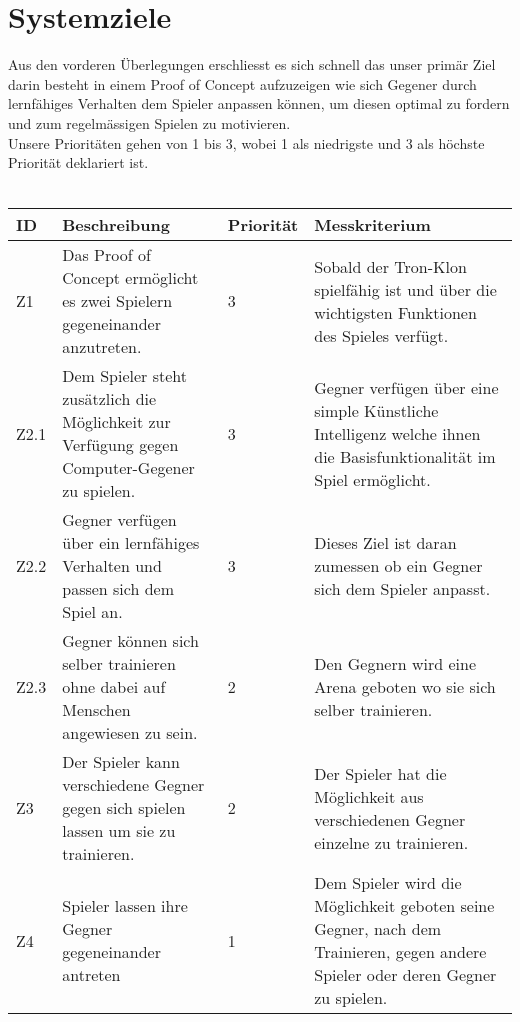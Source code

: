 \section{Systemziele}

Aus den vorderen Überlegungen erschliesst es sich schnell das unser primär Ziel darin besteht in einem Proof of Concept aufzuzeigen wie sich Gegener durch lernfähiges Verhalten dem Spieler anpassen können, um diesen optimal zu fordern und zum regelmässigen Spielen zu motivieren.  
\\ 
Unsere Prioritäten gehen von 1 bis 3, wobei 1 als niedrigste und 3 als höchste Priorität deklariert ist.
\\\\
\begin{tabularx}{\textwidth}{| p{0.7cm} | X | p{1.5cm} | X |}
\hline
\rowcolor[gray]{0.9} ID & Beschreibung & Priorität & Messkriterium\\
\hline
Z1 & Das Proof of Concept ermöglicht es zwei Spielern gegeneinander anzutreten. & 3 & Sobald der Tron-Klon spielfähig ist und über die wichtigsten Funktionen des Spieles verfügt.\\
\hline
Z2.1 & Dem Spieler steht zusätzlich die Möglichkeit zur Verfügung gegen Computer-Gegener zu spielen. & 3 & Gegner verfügen über eine simple Künstliche Intelligenz welche ihnen die Basisfunktionalität im Spiel ermöglicht. \\
\hline
Z2.2 & Gegner verfügen über ein lernfähiges Verhalten und passen sich dem Spiel an. & 3 & Dieses Ziel ist daran zumessen ob ein Gegner sich dem Spieler anpasst. \\
\hline 
Z2.3 & Gegner können sich selber trainieren ohne dabei auf Menschen angewiesen zu sein.  & 2 & Den Gegnern wird eine Arena geboten wo sie sich selber trainieren. \\
\hline
Z3 & Der Spieler kann verschiedene Gegner gegen sich spielen lassen um sie zu trainieren. & 2 & Der Spieler hat die Möglichkeit aus verschiedenen Gegner einzelne zu trainieren. \\
\hline
Z4 & Spieler lassen ihre Gegner gegeneinander antreten & 1 & Dem Spieler wird die Möglichkeit geboten seine Gegner, nach dem Trainieren, gegen andere Spieler oder deren Gegner zu spielen. \\
\hline
\end{tabularx}